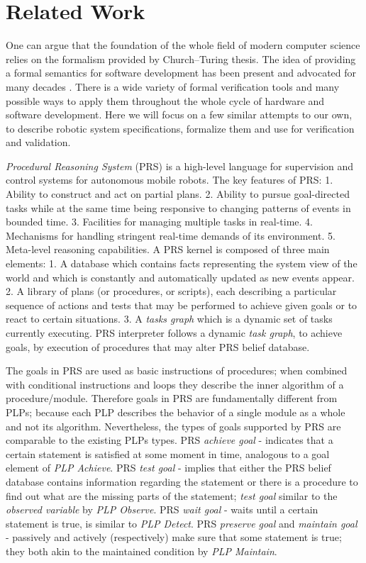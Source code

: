 \chapter{Related Work}
\par One can argue that the foundation of the whole field of modern computer science relies on the formalism provided by Church–Turing thesis. The idea of providing a formal semantics for software development has been present and advocated for many decades \cite{scott1971toward}. There is a wide variety of formal verification tools and many possible ways to apply them throughout the whole cycle of hardware and software development. Here we will focus on a few similar attempts to our own, to describe robotic system specifications, formalize them and use for verification and validation.
\par \textit{Procedural Reasoning System} (PRS) \cite{ingrand1996prs} is a high-level language for supervision and control systems for autonomous mobile robots. The key features of PRS: 1. Ability to construct and act on partial plans. 2. Ability to pursue goal-directed tasks while at the same time being responsive to changing patterns of events in bounded time. 3. Facilities for managing multiple tasks in real-time. 4. Mechanisms for handling stringent real-time demands of its environment. 5. Meta-level reasoning capabilities. A PRS kernel is composed of three main elements: 1. A database which contains facts representing the system view of the world and which is constantly and automatically updated as new events appear. 2. A library of plans (or procedures, or scripts), each describing a particular sequence of actions and tests that may be performed to achieve given goals or to react to certain situations. 3. A \textit{tasks graph} which is a dynamic set of tasks currently executing. PRS interpreter follows a dynamic \textit{task graph}, to achieve goals, by execution of procedures that may alter PRS belief database. 
\par The goals in PRS are used as basic instructions of procedures; when combined with conditional instructions and loops they describe the inner algorithm of a procedure/module. Therefore goals in PRS are fundamentally different from PLPs; because each PLP describes the behavior of a single module as a whole and not its algorithm. Nevertheless, the types of goals supported by PRS are comparable to the existing PLPs types. PRS \textit{achieve goal} - indicates that a certain statement is satisfied at some moment in time,  analogous to a goal element of \textit{PLP Achieve}. PRS \textit{test goal} - implies that either the PRS belief database contains information regarding the statement or there is a procedure to find out what are the missing parts of the statement; \textit{test goal} similar to the \textit{observed variable} by \textit{PLP Observe}. PRS \textit{wait goal} - waits until a certain statement is true, is similar to \textit{PLP Detect}. PRS \textit{preserve goal} and \textit{maintain goal} - passively and actively (respectively) make sure that some statement is true; they both akin to the maintained condition by \textit{PLP Maintain}. 
